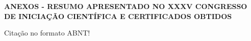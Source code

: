 \begin{titlepage}
\label{apendiceA_resumoCIC}
    \begin{center}
        \bf \large {ANEXOS - RESUMO APRESENTADO NO XXXV CONGRESSO DE INICIAÇÃO CIENTÍFICA E CERTIFICADOS OBTIDOS}
    \end{center}

    \vspace*{\fill}
    \begin{flushright}
    Citação no formato ABNT! 
    \end{flushright}

\end{titlepage}


